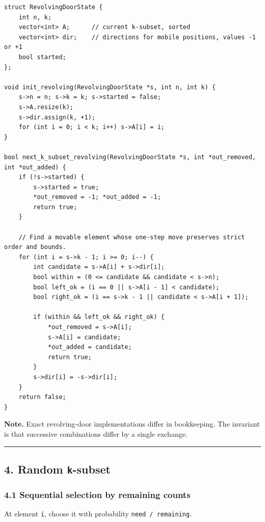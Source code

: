 \documentclass[11pt]{article}
\begin{document}
\begin{verbatim}
struct RevolvingDoorState {
    int n, k;
    vector<int> A;      // current k-subset, sorted
    vector<int> dir;    // directions for mobile positions, values -1 or +1
    bool started;
};

void init_revolving(RevolvingDoorState *s, int n, int k) {
    s->n = n; s->k = k; s->started = false;
    s->A.resize(k);
    s->dir.assign(k, +1);
    for (int i = 0; i < k; i++) s->A[i] = i;
}

bool next_k_subset_revolving(RevolvingDoorState *s, int *out_removed, int *out_added) {
    if (!s->started) {
        s->started = true;
        *out_removed = -1; *out_added = -1;
        return true;
    }

    // Find a movable element whose one-step move preserves strict order and bounds.
    for (int i = s->k - 1; i >= 0; i--) {
        int candidate = s->A[i] + s->dir[i];
        bool within = (0 <= candidate && candidate < s->n);
        bool left_ok = (i == 0 || s->A[i - 1] < candidate);
        bool right_ok = (i == s->k - 1 || candidate < s->A[i + 1]);

        if (within && left_ok && right_ok) {
            *out_removed = s->A[i];
            s->A[i] = candidate;
            *out_added = candidate;
            return true;
        }
        s->dir[i] = -s->dir[i];
    }
    return false;
}
\end{verbatim}

\textbf{Note.} Exact revolving-door implementations differ in bookkeeping. The invariant is that successive combinations differ by a single exchange.

\begin{center}\rule{0.5\linewidth}{0.5pt}\end{center}

\subsection{\texorpdfstring{4. Random \texttt{k}-subset}{4. Random k-subset}}\label{random-k-subset}

\subsubsection{4.1 Sequential selection by remaining counts}\label{sequential-selection-by-remaining-counts}

At element \texttt{i}, choose it with probability \texttt{need / remaining}.
\end{document}
